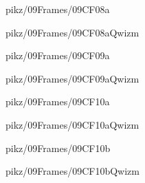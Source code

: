 \documentclass[9pt,xcolor={svgnames, x11names}]{beamer}
\begin{document}

\begin{frame}{pikz/09Frames/09CF08a}
  
\end{frame}


\begin{frame}{pikz/09Frames/09CF08aQwizm}
  
\end{frame}


\begin{frame}{pikz/09Frames/09CF09a}
  
\end{frame}


\begin{frame}{pikz/09Frames/09CF09aQwizm}
  
\end{frame}


\begin{frame}{pikz/09Frames/09CF10a}
  
\end{frame}


\begin{frame}{pikz/09Frames/09CF10aQwizm}
  
\end{frame}


\begin{frame}{pikz/09Frames/09CF10b}
  
\end{frame}

\begin{frame}{pikz/09Frames/09CF10bQwizm}
  
\end{frame}
\end{document}
